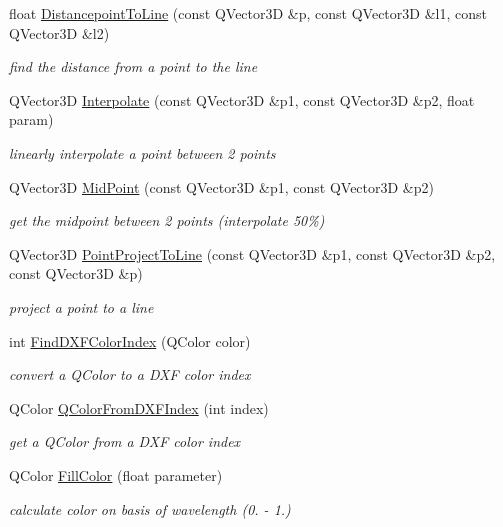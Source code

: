 \begin{DoxyCompactItemize}
float \hyperlink{namespaceShipCAD_a69361fa79b1f818e21306f6266ee45d3}{Distancepoint\+To\+Line} (const Q\+Vector3D \&p, const Q\+Vector3D \&l1, const Q\+Vector3D \&l2)
\begin{DoxyCompactList}\small\item\em find the distance from a point to the line \end{DoxyCompactList}\item 
Q\+Vector3D \hyperlink{namespaceShipCAD_a83f7c2b40959a0d02a2cc1085b0d07ee}{Interpolate} (const Q\+Vector3D \&p1, const Q\+Vector3D \&p2, float param)
\begin{DoxyCompactList}\small\item\em linearly interpolate a point between 2 points \end{DoxyCompactList}\item 
Q\+Vector3D \hyperlink{namespaceShipCAD_ad1ad66c896fe763fb4603989ff1f1182}{Mid\+Point} (const Q\+Vector3D \&p1, const Q\+Vector3D \&p2)
\begin{DoxyCompactList}\small\item\em get the midpoint between 2 points (interpolate 50\%) \end{DoxyCompactList}\item 
Q\+Vector3D \hyperlink{namespaceShipCAD_a30b09a2ad6cc05c2ce1cdc450a0857d1}{Point\+Project\+To\+Line} (const Q\+Vector3D \&p1, const Q\+Vector3D \&p2, const Q\+Vector3D \&p)
\begin{DoxyCompactList}\small\item\em project a point to a line \end{DoxyCompactList}\item 
int \hyperlink{namespaceShipCAD_a87efc267ae07a84fb1cd55a4562c2907}{Find\+D\+X\+F\+Color\+Index} (Q\+Color color)
\begin{DoxyCompactList}\small\item\em convert a Q\+Color to a D\+XF color index \end{DoxyCompactList}\item 
Q\+Color \hyperlink{namespaceShipCAD_a9956eca83968462fc4c48c376a10d577}{Q\+Color\+From\+D\+X\+F\+Index} (int index)
\begin{DoxyCompactList}\small\item\em get a Q\+Color from a D\+XF color index \end{DoxyCompactList}\item 
Q\+Color \hyperlink{namespaceShipCAD_acb142056788b7a6e18e908c5b2fd8d52}{Fill\+Color} (float parameter)
\begin{DoxyCompactList}\small\item\em calculate color on basis of wavelength (0. -\/ 1.) \end{DoxyCompactList}\item 

\end{DoxyCompactItemize}
